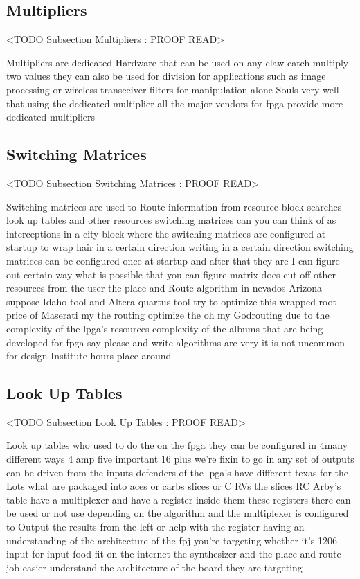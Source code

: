 \subsection{Multipliers}
	<TODO Subsection Multipliers : PROOF READ>

Multipliers are dedicated Hardware that can be used on any claw catch multiply two values they can also be used for division for applications such as image processing or wireless transceiver filters for manipulation alone Souls very well that using the dedicated multiplier all the major vendors for fpga provide more dedicated multipliers

\subsection{Switching Matrices}
	<TODO Subsection Switching Matrices : PROOF READ>

Switching matrices are used to Route information from resource block searches look up tables and other resources switching matrices can you can think of as interceptions in a city block where the switching matrices are configured at startup to wrap hair in a certain direction writing in a certain direction switching matrices can be configured once at startup and after that they are I can figure out certain way what is possible that you can figure matrix does cut off other resources from the user the place and Route algorithm in nevados Arizona suppose Idaho tool and Altera quartus tool try to optimize this wrapped root price of Maserati my the routing optimize the oh my Godrouting due to the complexity of the lpga's resources complexity of the albums that are being developed for fpga say please and write algorithms are very it is not uncommon for design Institute hours place around

\subsection{Look Up Tables}
	<TODO Subsection Look Up Tables : PROOF READ>

Look up tables who used to do the on the fpga they can be configured in 4many different ways 4 amp five important 16 plus we're fixin to go in any set of outputs can be driven from the inputs defenders of the lpga's have different texas for the Lots what are packaged into aces or carbs slices or C RVs the slices RC Arby's table have a multiplexer and have a register inside them these registers there can be used or not use depending on the algorithm and the multiplexer is configured to Output the results from the left or help with the register having an understanding of the architecture of the fpj you're targeting whether it's 1206 input for input food fit on the internet the synthesizer and the place and route job easier understand the architecture of the board they are targeting

